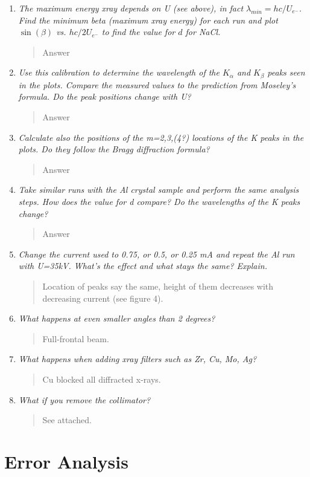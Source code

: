 \documentclass{amsart}
\begin{document}
\begin{enumerate}
\item {\textit{The maximum energy xray depends on U (see above), in fact $\lambda_{min}={hc}/{U_{e^-}}$. Find the minimum beta (maximum xray energy) for each run and plot $\sin(\beta)$ vs. ${hc}/{2U_{e^-}}$ to find the value for $d$ for NaCl.}
\begin{quote}
Answer
\end{quote}}

\item {\textit{Use this calibration to determine the wavelength of the $K_{\alpha}$ and $K_{\beta}$ peaks seen in the plots. Compare the measured values to the prediction from Moseley's formula. Do the peak positions change with U?}
\begin{quote}
Answer
\end{quote}}

\item {\textit{Calculate also the positions of the m=2,3,(4?) locations of the K peaks in the plots. Do they follow the Bragg diffraction formula?}
\begin{quote}
Answer
\end{quote}}

\item {\textit{Take similar runs with the Al crystal sample and perform the same analysis steps. How does the value for d compare? Do the wavelengths of the K peaks change?}
\begin{quote}
Answer
\end{quote}}

\item {\textit{Change the current used to 0.75, or 0.5, or 0.25 mA and repeat the Al run with U=35kV. What's the effect and what stays the same? Explain.}
\begin{quote}
Location of peaks say the same, height of them decreases with decreasing current (see figure 4).
\end{quote}}

\item {\textit{What happens at even smaller angles than 2 degrees?}
\begin{quote}
Full-frontal beam.
\end{quote}}

\item{\textit{What happens when adding xray filters such as Zr, Cu, Mo, Ag?}
\begin{quote}
Cu blocked all diffracted x-rays.
\end{quote}}

\item{\textit{What if you remove the collimator?}
\begin{quote}
See attached.
\end{quote}}

\end{enumerate}

\section{Error Analysis}
\end{document}
